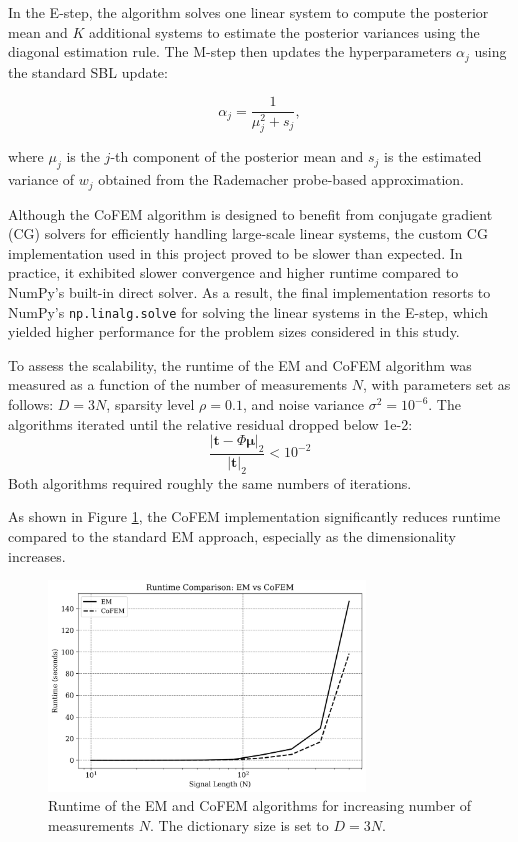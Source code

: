 \documentclass{article}
\begin{document}
In the E-step, the algorithm solves one linear system to compute the posterior mean and $ K $ additional systems to estimate the posterior variances using the diagonal estimation rule. The M-step then updates the hyperparameters $ \alpha_j $ using the standard SBL update:

\begin{equation}
    \alpha_j = \frac{1}{\mu_j^2 + s_j},
\end{equation}

where $ \mu_j $ is the $ j $-th component of the posterior mean and $ s_j $ is the estimated variance of $ w_j $ obtained from the Rademacher probe-based approximation.

Although the CoFEM algorithm is designed to benefit from conjugate gradient (CG) solvers for efficiently handling large-scale linear systems, the custom CG implementation used in this project proved to be slower than expected. In practice, it exhibited slower convergence and higher runtime compared to NumPy’s built-in direct solver. As a result, the final implementation resorts to NumPy’s \texttt{np.linalg.solve} for solving the linear systems in the E-step, which yielded higher performance for the problem sizes considered in this study.

To assess the scalability, the runtime of the EM and CoFEM algorithm was measured as a function of the number of measurements $ N $, with parameters set as follows:  $ D = 3N $, sparsity level $ \rho = 0.1 $, and noise variance $ \sigma^2 = 10^{-6} $. The algorithms iterated until the relative residual dropped below 1e-2:
\begin{equation}
\frac{|\mathbf{t} - \Phi \boldsymbol{\mu}|_2}{|\mathbf{t}|_2} < 10^{-2}
\end{equation}
Both algorithms required roughly the same numbers of iterations.

As shown in Figure \ref{fig:runtime_comparison}, the CoFEM implementation significantly reduces runtime compared to the standard EM approach, especially as the dimensionality increases.

\begin{figure}[H]
    \centering
    \includegraphics[width=0.75\textwidth]{Figures/runtime_comp.png}
    \caption{Runtime of the EM and CoFEM algorithms for increasing number of measurements $ N $. The dictionary size is set to $ D = 3N $.}
    \label{fig:runtime_comparison}
\end{figure}
\end{document}
